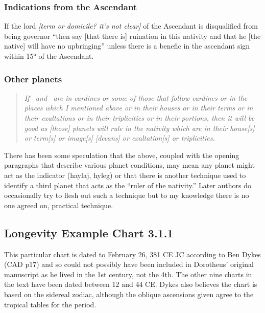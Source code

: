 \subsubsection{Indications from the Ascendant}
If  the lord \textsl{[term or domicile? it's not clear]} of the Ascendant is disqualified from being governor ``then say [that there is] ruination in this nativity and that he [the native] will have no upbringing'' unless there is a benefic in the ascendant sign within 15° of the Ascendant.

\subsubsection{Other planets}
\begin{quote}
\textsl{ If \Mars\, and \Jupiter\, are in cardines or some of those that follow cardines or in the places which I mentioned above or in their houses or in their terms or in their exaltations or in their triplicities or in their portions, then it will be good as [those] planets will rule in the nativity which are in their house[s] or term[s] or image[s] [decans] or exaltation[s] or triplicities.}
\end{quote}

There has been some speculation that the above, coupled with the opening paragraphs that describe various planet conditions, may mean any planet might act as the indicator (haylaj, hyleg) or that there is another technique used to identify a third planet that acts as the ``ruler of the nativity.'' Later authors do occasionally try to flesh out such a technique but to my knowledge there is no one agreed on, practical technique.

\newpage
\subsection{Longevity Example Chart 3.1.1}
\vspace{0.5em}
\begin{mdframed}[backgroundcolor=cyan!5, rightmargin=1em, leftmargin=1em]
This particular chart is dated to February 26, 381 CE JC according to Ben Dykes (CAD p17) and so could not possibly have been included in Dorotheus' original manuscript as he lived in the 1st century, not the 4th. The other nine charts in the text have been dated between 12 and 44 CE. Dykes also believes the chart is based on the sidereal zodiac, although the oblique ascensions given agree to the tropical tables for the period.
\end{mdframed}

